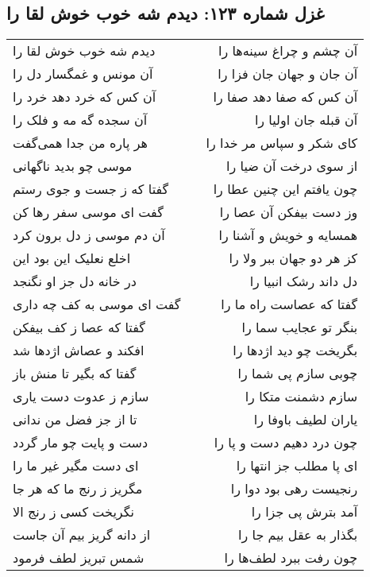 \begin{center}
\section*{غزل شماره ۱۲۳: دیدم شه خوب خوش لقا را}
\label{sec:0123}
\begin{longtable}{l p{0.5cm} r}
دیدم شه خوب خوش لقا را
&&
آن چشم و چراغ سینه‌ها را
\\
آن مونس و غمگسار دل را
&&
آن جان و جهان جان فزا را
\\
آن کس که خرد دهد خرد را
&&
آن کس که صفا دهد صفا را
\\
آن سجده گه مه و فلک را
&&
آن قبله جان اولیا را
\\
هر پاره من جدا همی‌گفت
&&
کای شکر و سپاس مر خدا را
\\
موسی چو بدید ناگهانی
&&
از سوی درخت آن ضیا را
\\
گفتا که ز جست و جوی رستم
&&
چون یافتم این چنین عطا را
\\
گفت ای موسی سفر رها کن
&&
وز دست بیفکن آن عصا را
\\
آن دم موسی ز دل برون کرد
&&
همسایه و خویش و آشنا را
\\
اخلع نعلیک این بود این
&&
کز هر دو جهان ببر ولا را
\\
در خانه دل جز او نگنجد
&&
دل داند رشک انبیا را
\\
گفت ای موسی به کف چه داری
&&
گفتا که عصاست راه ما را
\\
گفتا که عصا ز کف بیفکن
&&
بنگر تو عجایب سما را
\\
افکند و عصاش اژدها شد
&&
بگریخت چو دید اژدها را
\\
گفتا که بگیر تا منش باز
&&
چوبی سازم پی شما را
\\
سازم ز عدوت دست یاری
&&
سازم دشمنت متکا را
\\
تا از جز فضل من ندانی
&&
یاران لطیف باوفا را
\\
دست و پایت چو مار گردد
&&
چون درد دهیم دست و پا را
\\
ای دست مگیر غیر ما را
&&
ای پا مطلب جز انتها را
\\
مگریز ز رنج ما که هر جا
&&
رنجیست رهی بود دوا را
\\
نگریخت کسی ز رنج الا
&&
آمد بترش پی جزا را
\\
از دانه گریز بیم آن جاست
&&
بگذار به عقل بیم جا را
\\
شمس تبریز لطف فرمود
&&
چون رفت ببرد لطف‌ها را
\\
\end{longtable}
\end{center}
